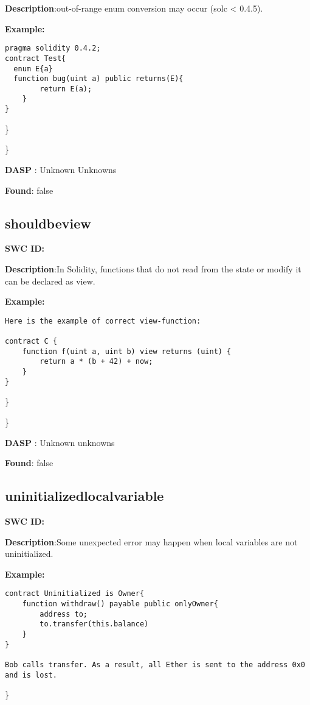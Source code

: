 \documentclass{article}
\begin{document}
\textbf{Description}:out-of-range enum conversion may occur (solc < 0.4.5).


\textbf{Example:} 
\begin{verbatim}
pragma solidity 0.4.2;
contract Test{
  enum E{a}
  function bug(uint a) public returns(E){
        return E(a);
    }
}

\end{verbatim}\} 

\} 

\textbf{DASP} : Unknown Unknowns

\textbf{Found}: false

\subsection{should\textunderscore be\textunderscore view} 
\textbf{SWC \textunderscore ID:} 

\textbf{Description}:In Solidity, functions that do not read from the state or modify it can be declared as view.


\textbf{Example:} 
\begin{verbatim}
Here is the example of correct view-function:

contract C {
    function f(uint a, uint b) view returns (uint) {
        return a * (b + 42) + now;
    }
}

\end{verbatim}\} 

\} 

\textbf{DASP} : Unknown unknowns

\textbf{Found}: false

\subsection{uninitialized\textunderscore local\textunderscore variable} 
\textbf{SWC \textunderscore ID:} 

\textbf{Description}:Some unexpected error may happen when local variables are not uninitialized.


\textbf{Example:} 
\begin{verbatim}
contract Uninitialized is Owner{
    function withdraw() payable public onlyOwner{
        address to;
        to.transfer(this.balance)
    }
}

Bob calls transfer. As a result, all Ether is sent to the address 0x0 and is lost.

\end{verbatim}\} 
\end{document}
